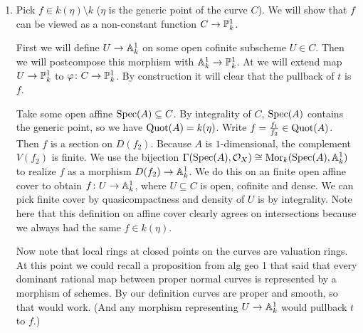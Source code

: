 \newcommand{\sheet}{5}




\maketitle{}

\begin{exercise}{1}
    \begin{enumerate}[label=(\roman*)]
        \item{
                Pick $f \in k(\eta) \setminus k$ ($\eta$ is the generic point of
                the curve $C$).
                We will show that $f$ can be viewed as a non-constant function
                $C \to \mathbb{P}^1_k$.

                First we will define $U \to \mathbb{A}^1_k$ on some open cofinite
                subscheme $U \in C$. Then we will postcompose this morphism with
                $\mathbb{A}^1_k \to \mathbb{P}^1_k$. At we will extend map $U \to
                \mathbb{P}^1_k$ to $\varphi \colon C \to \mathbb{P}^1_k$. By
                construction it will clear that the pullback of $t$ is $f$.
        
                Take some open affine $\operatorname{Spec}(A) \subseteq C$.
                By integrality of $C$, $\operatorname{Spec}(A)$ contains the generic point, so
                we have $\operatorname{Quot}(A) = k(\eta)$.
                Write $f = \frac{f_1}{f_2} \in \operatorname{Quot}(A)$.
                Then $f$ is a section on $D(f_2)$.
                Because $A$ is $1$-dimensional, the complement $V(f_2)$ is finite.
                We use the bijection $\Gamma(\operatorname{Spec}(A), \mathcal{O}_X) \cong \operatorname{Mor}_k(\operatorname{Spec}(A),
                \mathbb{A}^1_k)$ to realize $f$ as a morphism $D(f_2) \to \mathbb{A}^1_k$.
                We do this on an finite open affine cover to obtain $f \colon U \to \mathbb{A}^1_k$, where $U
                \subseteq C$ is open, cofinite and dense. We can pick finite
                cover by quasicompactness and density of $U$ is by integrality.
                Note here that this definition on affine cover clearly agrees on
                intersections because we always had the same $f \in k(\eta)$.

                Now note that local rings at closed points on the curves are
                valuation rings. At this point we could recall a proposition
                from alg geo 1 that said that every dominant rational map
                between proper normal curves is represented by a morphism of
                schemes. By our definition curves are proper and smooth, so that
                would work. (And any morphism representing $U \to \mathbb{A}^1_k$
                would pullback $t$ to $f$.)
        
}
\end{enumerate}
\end{exercise}
